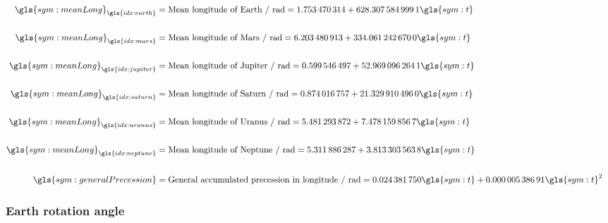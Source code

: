 \begin{align}
                    \notag  \\
  \gls{sym:meanLong}_{\gls{idx:earth}}   &= \text{Mean longitude of Earth / rad} = \num{1.753470314} + \num{628.3075849991}\gls{sym:t}   \\
                    \notag  \\
  \gls{sym:meanLong}_{\gls{idx:mars}}    &= \text{Mean longitude of Mars / rad} = \num{6.203480913} + \num{334.0612426700}\gls{sym:t}   \\
                    \notag  \\
  \gls{sym:meanLong}_{\gls{idx:jupiter}} &= \text{Mean longitude of Jupiter / rad} = \num{0.599546497} + \num{52.9690962641}\gls{sym:t}   \\
                    \notag  \\
  \gls{sym:meanLong}_{\gls{idx:saturn}} &= \text{Mean longitude of Saturn / rad} = \num{0.874016757} + \num{21.3299104960}\gls{sym:t}   \\
                    \notag  \\
  \gls{sym:meanLong}_{\gls{idx:uranus}} &= \text{Mean longitude of Uranus / rad} = \num{5.481293872} + \num{7.4781598567}\gls{sym:t}   \\
                    \notag  \\
  \gls{sym:meanLong}_{\gls{idx:neptune}} &= \text{Mean longitude of Neptune / rad} = \num{5.311886287} + \num{3.8133035638}\gls{sym:t}   \\
                    \notag  \\
  \gls{sym:generalPrecession} &= \text{General accumulated precession in longitude / rad} = \num{0.024381750}\gls{sym:t} + \num{0.00000538691}\gls{sym:t}^2
\end{align}

\subsubsection{Earth rotation angle}
\label{sec:earth-rotation-angle}

